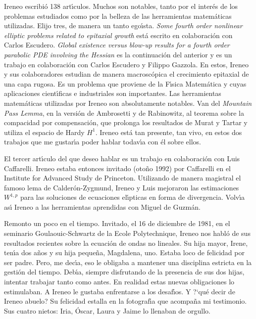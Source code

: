 Ireneo escribi\'o 138 art{\'\i}culos. Muchos son notables, tanto por el inter\'es de los problemas estudiados como por la belleza de las herramientas matem\'aticas utilizadas. Elijo tres, de manera un tanto ego{\'\i}sta. {\it Some fourth order nonlinear elliptic problems related to epitaxial growth }  est\'a escrito en colaboraci\'on con Carlos Escudero. {\it Global existence versus blow-up results for a fourth order parabolic PDE involving the Hessian} es la continuaci\'on del anterior y es un trabajo en colaboraci\'on con Carlos Escudero y Filippo Gazzola. En estos, Ireneo y sus colaboradores estudian de manera macrosc\'opica  el crecimiento epitaxial de una capa rugosa. Es un problema que proviene de la F{\'\i}sica Matem\'atica y cuyas aplicaciones cient{\'\i}ficas e industriales son importantes. Las herramientas matem\'aticas utilizadas por Ireneo son absolutamente notables. Van del \textit{Mountain Pass Lemma}, en la versi\'on de Ambrosetti y de Rabinowitz, al teorema sobre la compacidad por compensaci\'on, que prolonga los resultados de Murat y Tartar y utiliza el espacio de Hardy $H^1$. Ireneo est\'a tan presente, tan vivo, en estos dos trabajos que  me gustar{\'\i}a poder hablar   todav{\'\i}a  con \'el  sobre ellos.



El tercer art{\'\i}culo del que deseo hablar es un trabajo en colaboraci\'on con Luis Caffarelli. Ireneo estaba entonces invitado (oto\~no 1992) por Caffarelli en el Institute for Advanced Study de Princeton. Utilizando de manera magistral el famoso lema de Calder\'on-Zygmund, Ireneo y Luis mejoraron las estimaciones $W^{1, p}$ para las soluciones de ecuaciones el{\'\i}pticas  en forma de divergencia. Volv{\'\i}a as{\'\i} Ireneo a las herramientas aprendidas con Miguel de Guzm\'an.


Remonto un poco en el tiempo. Invitado, el 16 de diciembre de 1981, en el seminario Goulaouic-Schwartz de la Ecole Polytechnique, Ireneo nos habl\'o de sus resultados recientes sobre la ecuaci\'on de ondas no lineales. Su hija mayor, Irene, ten{\'\i}a dos a\~nos y su hija peque\~na, Magdalena, uno.  
Estaba loco de felicidad por ser padre. Pero, me dec{\'\i}a, eso le  
obligaba a  mantener una disciplina estricta en la gesti\'on del tiempo.  
Deb{\'\i}a, siempre disfrutando de la presencia de sus dos hijas, intentar  
trabajar tanto como antes. En realidad estas nuevas obligaciones lo  
estimulaban. A Ireneo le gustaba enfrentarse a los desaf{\'\i}os.
Y ?`qu\'e decir de Ireneo abuelo? Su felicidad estalla en la fotograf{\'\i}a  
que acompaña mi testimonio. Sus cuatro nietos: Iria, \'Oscar, Laura y  
Jaime lo llenaban de orgullo.


